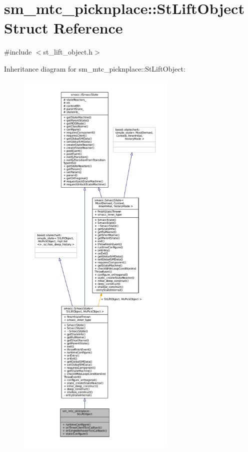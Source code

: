 \hypertarget{structsm__mtc__picknplace_1_1StLiftObject}{}\section{sm\+\_\+mtc\+\_\+picknplace\+:\+:St\+Lift\+Object Struct Reference}
\label{structsm__mtc__picknplace_1_1StLiftObject}


{\ttfamily \#include $<$st\+\_\+lift\+\_\+object.\+h$>$}



Inheritance diagram for sm\+\_\+mtc\+\_\+picknplace\+:\+:St\+Lift\+Object\+:
\nopagebreak
\begin{figure}[H]
\begin{center}
\leavevmode
\includegraphics[height=550pt]{structsm__mtc__picknplace_1_1StLiftObject__inherit__graph}
\end{center}
\end{figure}


